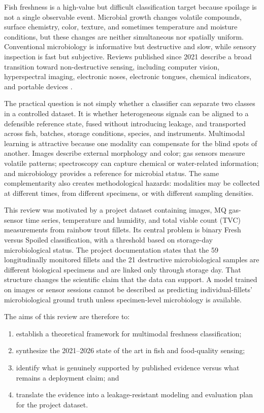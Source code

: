 \documentclass[11pt]{article}
\begin{document}
Fish freshness is a high-value but difficult classification target because spoilage is not a single observable event. Microbial growth changes volatile compounds, surface chemistry, color, texture, and sometimes temperature and moisture conditions, but these changes are neither simultaneous nor spatially uniform. Conventional microbiology is informative but destructive and slow, while sensory inspection is fast but subjective. Reviews published since 2021 describe a broad transition toward non-destructive sensing, including computer vision, hyperspectral imaging, electronic noses, electronic tongues, chemical indicators, and portable devices \citep{Franceschelli2021sensing,Zhang2022emerging,Madhubhashini2024current,Wang2024review}.

The practical question is not simply whether a classifier can separate two classes in a controlled dataset. It is whether heterogeneous signals can be aligned to a defensible reference state, fused without introducing leakage, and transported across fish, batches, storage conditions, species, and instruments. Multimodal learning is attractive because one modality can compensate for the blind spots of another. Images describe external morphology and color; gas sensors measure volatile patterns; spectroscopy can capture chemical or water-related information; and microbiology provides a reference for microbial status. The same complementarity also creates methodological hazards: modalities may be collected at different times, from different specimens, or with different sampling densities.

This review was motivated by a project dataset containing images, MQ gas-sensor time series, temperature and humidity, and total viable count (TVC) measurements from rainbow trout fillets. Its central problem is binary Fresh versus Spoiled classification, with a threshold based on storage-day microbiological status. The project documentation states that the 59 longitudinally monitored fillets and the 21 destructive microbiological samples are different biological specimens and are linked only through storage day. That structure changes the scientific claim that the data can support. A model trained on images or sensor sessions cannot be described as predicting individual-fillets' microbiological ground truth unless specimen-level microbiology is available.

The aims of this review are therefore to:
\begin{enumerate}[leftmargin=*,itemsep=2pt]
  \item establish a theoretical framework for multimodal freshness classification;
  \item synthesize the 2021--2026 state of the art in fish and food-quality sensing;
  \item identify what is genuinely supported by published evidence versus what remains a deployment claim; and
  \item translate the evidence into a leakage-resistant modeling and evaluation plan for the project dataset.
\end{enumerate}
\end{document}
